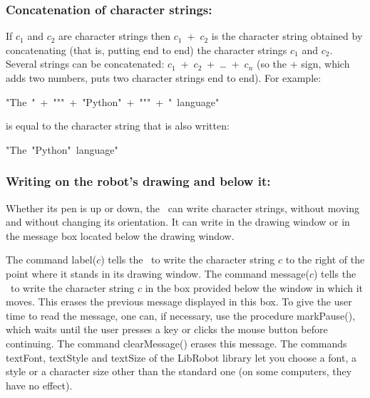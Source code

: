 \subsubsection{Concatenation of character strings:}
If $c_{1}$ and $c_{2}$ are character
strings then $c_{1}$\ {\idt +}\ $c_{2}$ is the character
string obtained by concatenating (that is, putting end to end) the character
strings $c_{1}$ and $c_{2}$. Several strings can be concatenated:
$c_{1}$\ {\idt +}\ $c_{2}$\ {\idt +}\ \ldots\ {\idt +}\ $c_{n}$ (so the {\idt +} sign, which
adds two numbers, puts two character strings end to end). For example:
\begin{center}
{\cha "The\ "}\ {\idt +}\ {\cha """}\ {\idt +}\ {\cha "Python"}\ {\idt +}\ {\cha """}\
{\idt +}\ {\cha "\ language"}
\end{center}
is equal to the character string that is also written:
\begin{center}
{\cha "The\ "Python"\ language"}
\end{center}

\subsubsection{Writing on the robot's drawing and below it:}
Whether its pen is up or down, the \robot\ can write character strings,
without moving and without changing its orientation. It can write in the drawing window or in the
message box located below the drawing window.

The command {\idt label($c$)} tells the \robot\ to write the character string $c$ to the right of the point
where it stands in its drawing window.
The command {\idt message($c$)} tells the \robot\ to write the character string $c$ in the
box provided below the window in which it moves. This erases the previous message
displayed in this
box. To give the user time to read the message, one can, if necessary, use the procedure
{\idt markPause()}, which waits until the user presses a key or clicks the mouse
button before continuing. The command {\idt clearMessage()} erases this message. The commands {\idt textFont},
{\idt textStyle} and {\idt textSize} of the {\idt LibRobot} library let you choose a font,
a style or a character size other than the standard one (on some computers, they have
no effect).

